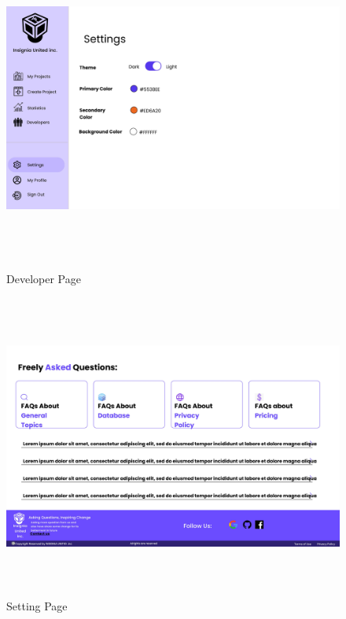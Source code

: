 \begin{figure}[H]
    \centering 
\includegraphics[height=10cm, width=1\textwidth]{./images/prototype/0006}
\caption{Developer Page}
\label{fig:prototype1}


\includegraphics[height=10cm, width=1\textwidth]{./images/prototype/0016}
\centering 
\caption{Setting Page}
\label{fig:prototype1}

\end{figure}
